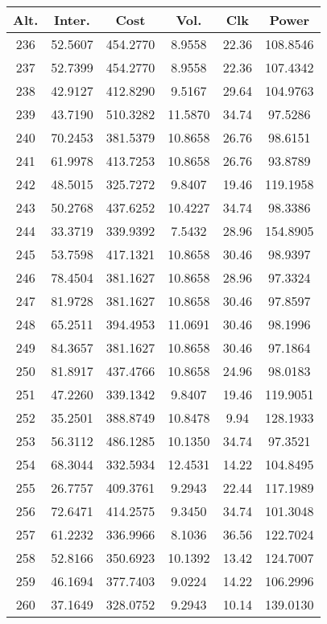 \begin{center}
\begin{footnotesize}
\begin{tabular}{|c|ccccc|}
\hline
Alt. & Inter. & Cost & Vol. & Clk & Power\\
\hline
236 & 52.5607 & 454.2770 & 8.9558 & 22.36 & 108.8546 \\
237 & 52.7399 & 454.2770 & 8.9558 & 22.36 & 107.4342 \\
238 & 42.9127 & 412.8290 & 9.5167 & 29.64 & 104.9763 \\
239 & 43.7190 & 510.3282 & 11.5870 & 34.74 & 97.5286 \\
240 & 70.2453 & 381.5379 & 10.8658 & 26.76 & 98.6151 \\
241 & 61.9978 & 413.7253 & 10.8658 & 26.76 & 93.8789 \\
242 & 48.5015 & 325.7272 & 9.8407 & 19.46 & 119.1958 \\
243 & 50.2768 & 437.6252 & 10.4227 & 34.74 & 98.3386 \\
244 & 33.3719 & 339.9392 & 7.5432 & 28.96 & 154.8905 \\
245 & 53.7598 & 417.1321 & 10.8658 & 30.46 & 98.9397 \\
246 & 78.4504 & 381.1627 & 10.8658 & 28.96 & 97.3324 \\
247 & 81.9728 & 381.1627 & 10.8658 & 30.46 & 97.8597 \\
248 & 65.2511 & 394.4953 & 11.0691 & 30.46 & 98.1996 \\
249 & 84.3657 & 381.1627 & 10.8658 & 30.46 & 97.1864 \\
250 & 81.8917 & 437.4766 & 10.8658 & 24.96 & 98.0183 \\
251 & 47.2260 & 339.1342 & 9.8407 & 19.46 & 119.9051 \\
252 & 35.2501 & 388.8749 & 10.8478 & 9.94 & 128.1933 \\
253 & 56.3112 & 486.1285 & 10.1350 & 34.74 & 97.3521 \\
254 & 68.3044 & 332.5934 & 12.4531 & 14.22 & 104.8495 \\
255 & 26.7757 & 409.3761 & 9.2943 & 22.44 & 117.1989 \\
256 & 72.6471 & 414.2575 & 9.3450 & 34.74 & 101.3048 \\
257 & 61.2232 & 336.9966 & 8.1036 & 36.56 & 122.7024 \\
258 & 52.8166 & 350.6923 & 10.1392 & 13.42 & 124.7007 \\
259 & 46.1694 & 377.7403 & 9.0224 & 14.22 & 106.2996 \\
260 & 37.1649 & 328.0752 & 9.2943 & 10.14 & 139.0130 \\

\end{tabular}
\end{footnotesize}
\end{center}
